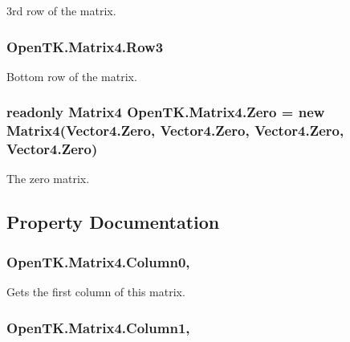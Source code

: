 3rd row of the matrix. 

\hypertarget{struct_open_t_k_1_1_matrix4_a4fac10569a36cd69f508ba6b4ea15cb5}{
\subsubsection[{Row3}]{ Open\-T\-K.\-Matrix4.\-Row3}}\label{struct_open_t_k_1_1_matrix4_a4fac10569a36cd69f508ba6b4ea15cb5}


Bottom row of the matrix. 

\hypertarget{struct_open_t_k_1_1_matrix4_a412c6bab3385cf1c7f84587cb413a7cf}{
\subsubsection[{Zero}]{\setlength{\rightskip}{0pt plus 5cm}readonly {\bf Matrix4} Open\-T\-K.\-Matrix4.\-Zero = new {\bf Matrix4}(Vector4.\-Zero, Vector4.\-Zero, Vector4.\-Zero, Vector4.\-Zero)\hspace{0.3cm}{\ttfamily [static]}}}\label{struct_open_t_k_1_1_matrix4_a412c6bab3385cf1c7f84587cb413a7cf}


The zero matrix. 



\subsection{Property Documentation}
\hypertarget{struct_open_t_k_1_1_matrix4_a98cd484a752138482978b3695af0ea97}{
\subsubsection[{Column0}]{ Open\-T\-K.\-Matrix4.\-Column0\hspace{0.3cm}{\ttfamily [get]}, {\ttfamily [set]}}}\label{struct_open_t_k_1_1_matrix4_a98cd484a752138482978b3695af0ea97}


Gets the first column of this matrix. 

\hypertarget{struct_open_t_k_1_1_matrix4_aa71936442a2e4d016158f6562457f8aa}{
\subsubsection[{Column1}]{ Open\-T\-K.\-Matrix4.\-Column1\hspace{0.3cm}{\ttfamily [get]}, {\ttfamily [set]}}}\label{struct_open_t_k_1_1_matrix4_aa71936442a2e4d016158f6562457f8aa}


